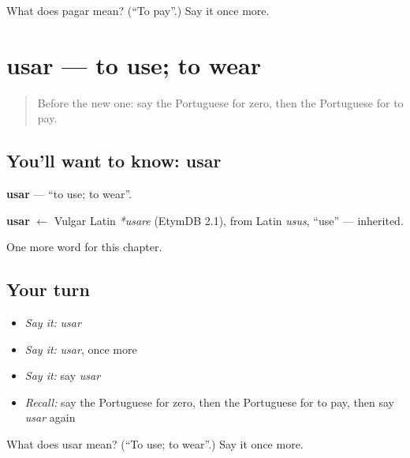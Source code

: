 \begin{tcolorbox}[breakable,colback=teal!4,colframe=teal!35!black,title={Before you move on}]
What does pagar mean? (\textquotedblleft{}To pay\textquotedblright{}.) Say it once more.
\end{tcolorbox}
\section[usar]{usar — to use; to wear}

\label{lesson:PT-C80-usar}



\begin{quote}
Before the new one: say the Portuguese for zero, then the Portuguese for to pay.
\end{quote}

\subsection*{You'll want to know: usar}
\textbf{usar} — \textquotedblleft{}to use; to wear\textquotedblright{}.

\begin{cousinweb}
\textbf{usar} $\leftarrow$ Vulgar Latin \emph{*usare} (EtymDB 2.1), from Latin \emph{usus}, \textquotedblleft{}use\textquotedblright{} — inherited.
\end{cousinweb}

\begin{grammarlens}[title={What you've built}]
One more word for this chapter.
\end{grammarlens}

\subsection*{Your turn}
\begin{itemize}
\raggedright
  \item \emph{Say it:} \emph{usar}
  \item \emph{Say it:} \emph{usar}, once more
  \item \emph{Say it:} say \emph{usar}
  \item \emph{Recall:} say the Portuguese for zero, then the Portuguese for to pay, then say \emph{usar} again
\end{itemize}

\begin{tcolorbox}[breakable,colback=teal!4,colframe=teal!35!black,title={Before you move on}]
What does usar mean? (\textquotedblleft{}To use; to wear\textquotedblright{}.) Say it once more.
\end{tcolorbox}
